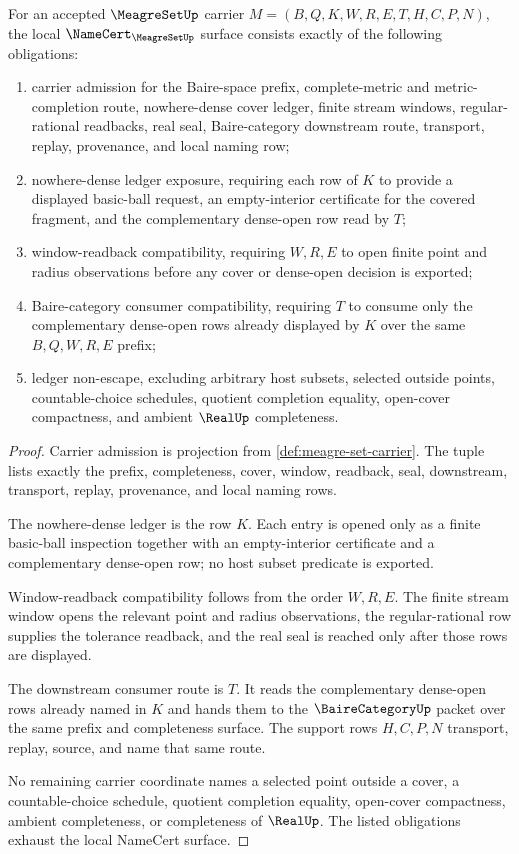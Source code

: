 \begin{theorem}\label{thm:meagre-set-namecert-obligations}
For an accepted $\MeagreSetUp$ carrier $M=(B,Q,K,W,R,E,T,H,C,P,N)$, the local $\NameCert_{\MeagreSetUp}$ surface consists exactly of the following obligations:
\begin{enumerate}
\item carrier admission for the Baire-space prefix, complete-metric and metric-completion route, nowhere-dense cover ledger, finite stream windows, regular-rational readbacks, real seal, Baire-category downstream route, transport, replay, provenance, and local naming row;
\item nowhere-dense ledger exposure, requiring each row of $K$ to provide a displayed basic-ball request, an empty-interior certificate for the covered fragment, and the complementary dense-open row read by $T$;
\item window-readback compatibility, requiring $W,R,E$ to open finite point and radius observations before any cover or dense-open decision is exported;
\item Baire-category consumer compatibility, requiring $T$ to consume only the complementary dense-open rows already displayed by $K$ over the same $B,Q,W,R,E$ prefix;
\item ledger non-escape, excluding arbitrary host subsets, selected outside points, countable-choice schedules, quotient completion equality, open-cover compactness, and ambient $\RealUp$ completeness.
\end{enumerate}
\end{theorem}
\begin{proof}
Carrier admission is projection from \autoref{def:meagre-set-carrier}. The tuple lists exactly the prefix, completeness, cover, window, readback, seal, downstream, transport, replay, provenance, and local naming rows.

The nowhere-dense ledger is the row $K$. Each entry is opened only as a finite basic-ball inspection together with an empty-interior certificate and a complementary dense-open row; no host subset predicate is exported.

Window-readback compatibility follows from the order $W,R,E$. The finite stream window opens the relevant point and radius observations, the regular-rational row supplies the tolerance readback, and the real seal is reached only after those rows are displayed.

The downstream consumer route is $T$. It reads the complementary dense-open rows already named in $K$ and hands them to the $\BaireCategoryUp$ packet over the same prefix and completeness surface. The support rows $H,C,P,N$ transport, replay, source, and name that same route.

No remaining carrier coordinate names a selected point outside a cover, a countable-choice schedule, quotient completion equality, open-cover compactness, ambient completeness, or completeness of $\RealUp$. The listed obligations exhaust the local NameCert surface.
\end{proof}

